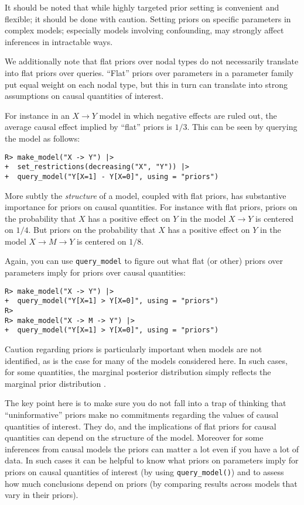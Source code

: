 \documentclass[
  11pt,
  article]{jss}
\begin{document}
It should be noted that while highly targeted prior setting is
convenient and flexible; it should be done with caution. Setting priors
on specific parameters in complex models; especially models involving
confounding, may strongly affect inferences in intractable ways.

We additionally note that flat priors over nodal types do not
necessarily translate into flat priors over queries. ``Flat'' priors
over parameters in a parameter family put equal weight on each nodal
type, but this in turn can translate into strong assumptions on causal
quantities of interest.

For instance in an \(X \rightarrow Y\) model in which negative effects
are ruled out, the average causal effect implied by ``flat'' priors is
\(1/3\). This can be seen by querying the model as follows:

\begin{verbatim}
R> make_model("X -> Y") |>
+  set_restrictions(decreasing("X", "Y")) |>
+  query_model("Y[X=1] - Y[X=0]", using = "priors")
\end{verbatim}

More subtly the \emph{structure} of a model, coupled with flat priors,
has substantive importance for priors on causal quantities. For instance
with flat priors, priors on the probability that \(X\) has a positive
effect on \(Y\) in the model \(X \rightarrow Y\) is centered on \(1/4\).
But priors on the probability that \(X\) has a positive effect on \(Y\)
in the model \(X \rightarrow M \rightarrow Y\) is centered on \(1/8\).

Again, you can use \texttt{query\_model} to figure out what flat (or
other) priors over parameters imply for priors over causal quantities:

\begin{verbatim}
R> make_model("X -> Y") |>
+  query_model("Y[X=1] > Y[X=0]", using = "priors")
R> 
R> make_model("X -> M -> Y") |>
+  query_model("Y[X=1] > Y[X=0]", using = "priors")
\end{verbatim}

Caution regarding priors is particularly important when models are not
identified, as is the case for many of the models considered here. In
such cases, for some quantities, the marginal posterior distribution
simply reflects the marginal prior distribution
\citep{poirier_revising_1998}.

The key point here is to make sure you do not fall into a trap of
thinking that ``uninformative'' priors make no commitments regarding the
values of causal quantities of interest. They do, and the implications
of flat priors for causal quantities can depend on the structure of the
model. Moreover for some inferences from causal models the priors can
matter a lot even if you have a lot of data. In such cases it can be
helpful to know what priors on parameters imply for priors on causal
quantities of interest (by using \texttt{query\_model()}) and to assess
how much conclusions depend on priors (by comparing results across
models that vary in their priors).
\end{document}
